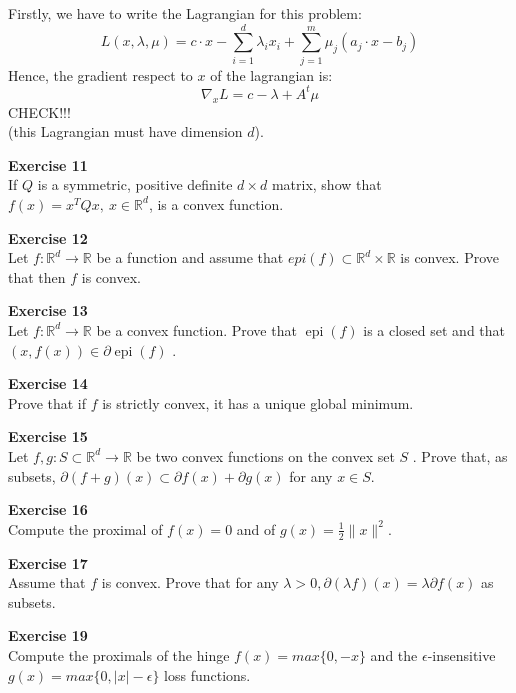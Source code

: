 \documentclass[11pt,table]{article}
\newenvironment{problem}[2][Exercise]
    { \begin{mdframed}[backgroundcolor=gray!20] \textbf{#1 #2} \\}
    {  \end{mdframed}}
\begin{document}
Firstly, we have to write the Lagrangian for this problem:
\[
L(x,\lambda,\mu) = c \cdot x -  \sum_{i=1}^d \lambda_i x_i  + \sum_{j=1}^m \mu_j(a_j \cdot x - b_j)  
\]
Hence, the gradient respect to \(x\) of the lagrangian is:
\[
\nabla_x L = c - \lambda + A^t \mu
\]
CHECK!!!\\
(this Lagrangian must have dimension \(d\)). 

\begin{problem}{11}
  If \( Q \) is a symmetric, positive definite \( d \times d \) matrix, show that \( f(x) = x^TQx, \ x \in \mathbb{R}^d \), is a convex function.
  \end{problem}

\begin{problem}{12}
  Let \( f:\mathbb{R}^d \to \mathbb{R} \)  be a function and assume that \( epi(f) \subset \mathbb{R}^d \times \mathbb{R} \)  is convex. Prove that then \( f \)  is convex.

\end{problem}



\begin{problem}{13}

  Let \( f : \mathbb{R}^d \to \mathbb{R} \) be a convex function. Prove that \( \operatorname{epi}(f) \) is a closed set and that \( (x, f(x)) \in \partial \operatorname{epi}(f) \)  .
\end{problem}

\begin{problem}{14}
  Prove that if \( f \)  is strictly convex, it has a unique global minimum.
\end{problem}


\begin{problem}{15}
  Let \( f,g: S \subset \mathbb{R}^d \to \mathbb{R} \)  be two convex functions on the convex set \( S \) . Prove that, as subsets, \( \partial(f+g)(x) \subset \partial f(x) + \partial g(x) \) for any $x\in S$.
  \end{problem}


\begin{problem}{16}
  Compute the proximal of \( f(x) = 0 \) and of \( g(x) = \frac{1}{2}\|x\|^2 \).
\end{problem}


\begin{problem}{17}
  Assume that \( f \)  is convex. Prove that for any \( \lambda > 0, \partial(\lambda f)(x) = \lambda \partial f(x) \) as subsets.
\end{problem}



\begin{problem}{19}Compute the proximals of the hinge \( f(x) = max\{0, -x\}  \) and the \( \epsilon \)-insensitive \( g(x)=max\{0, |x| - \epsilon\} \) loss functions.
  \end{problem}
\end{document}
